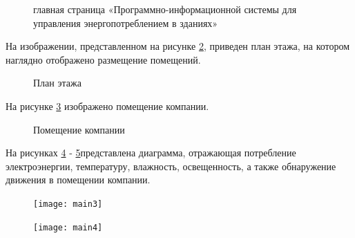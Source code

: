 \begin{figure}[H] %
\caption{главная страница  «Программно-информационной системы для управления энергопотреблением в зданиях»}
\label{templ21:image}
\end{figure}

\newpage

На изображении, представленном на рисунке \ref{main1:image}, приведен план этажа, на котором наглядно отображено размещение помещений.
 

\begin{figure}[ht]
\caption{План этажа}
\label{main1:image}
\end{figure}

На рисунке \ref{main2:image} изображено помещение компании.

\begin{figure}[ht]
\caption{Помещение компании}
\label{main2:image}
\end{figure}

На рисунках \ref{main3:image} - \ref{main4:image}представлена диаграмма, отражающая потребление электроэнергии, температуру, влажность, освещенность, а также обнаружение движения в помещении компании.


\begin{landscape}
	
	\begin{figure}
		\texttt{[image: main3]}
		\label{main3:image}      
	\end{figure}
	
	
		\begin{figure}
		\texttt{[image: main4]}
		\label{main4:image}      
	\end{figure}




\end{landscape}

\newpage